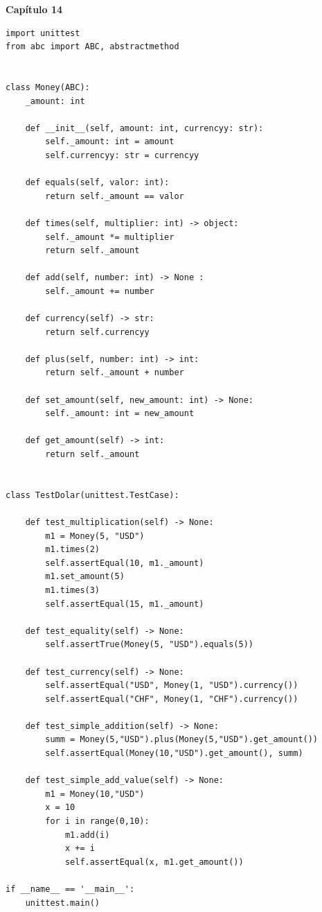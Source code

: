 \documentclass[a4paper,12pt]{article}
\newcommand{\capitulo}[1]{
    \vspace{1em}
    \noindent
    \colorbox{black!15}{
        \parbox{\dimexpr\linewidth-2\fboxsep}{
            \centering \Large \textbf{#1}
        }
    }
    \vspace{1em}
}
\begin{document}
\capitulo{Capítulo 14}
\begin{lstlisting}[style=pythonstyle]
import unittest
from abc import ABC, abstractmethod


class Money(ABC):
    _amount: int

    def __init__(self, amount: int, currencyy: str):
        self._amount: int = amount
        self.currencyy: str = currencyy 

    def equals(self, valor: int):
        return self._amount == valor 

    def times(self, multiplier: int) -> object:
        self._amount *= multiplier
        return self._amount

    def add(self, number: int) -> None :
        self._amount += number 

    def currency(self) -> str:
        return self.currencyy

    def plus(self, number: int) -> int:
        return self._amount + number 

    def set_amount(self, new_amount: int) -> None:
        self._amount: int = new_amount

    def get_amount(self) -> int:
        return self._amount


class TestDolar(unittest.TestCase):

    def test_multiplication(self) -> None:
        m1 = Money(5, "USD")
        m1.times(2) 
        self.assertEqual(10, m1._amount)
        m1.set_amount(5)
        m1.times(3) 
        self.assertEqual(15, m1._amount)

    def test_equality(self) -> None:
        self.assertTrue(Money(5, "USD").equals(5))

    def test_currency(self) -> None:
        self.assertEqual("USD", Money(1, "USD").currency())
        self.assertEqual("CHF", Money(1, "CHF").currency())

    def test_simple_addition(self) -> None:
        summ = Money(5,"USD").plus(Money(5,"USD").get_amount())
        self.assertEqual(Money(10,"USD").get_amount(), summ)

    def test_simple_add_value(self) -> None:
        m1 = Money(10,"USD")
        x = 10
        for i in range(0,10):
            m1.add(i)
            x += i
            self.assertEqual(x, m1.get_amount())

if __name__ == '__main__':
    unittest.main()
\end{lstlisting}
\end{document}
